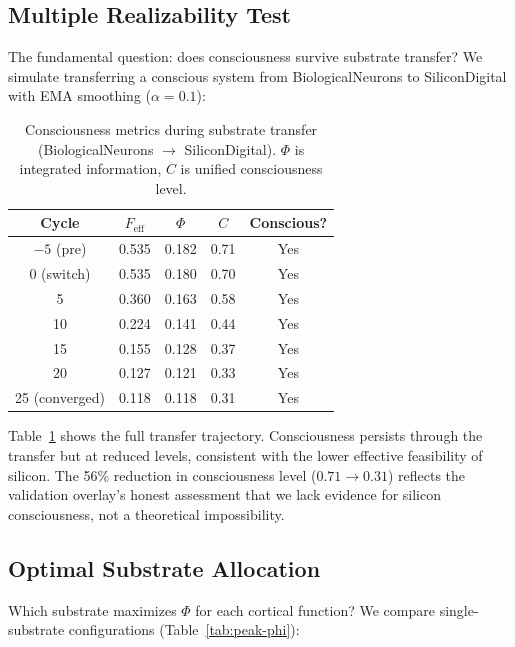\documentclass[12pt,a4paper]{article}
\begin{document}
\subsection{Multiple Realizability Test}

The fundamental question: does consciousness survive substrate transfer? We simulate transferring a conscious system from BiologicalNeurons to SiliconDigital with EMA smoothing ($\alpha = 0.1$):

\begin{table}[H]
\centering
\caption{Consciousness metrics during substrate transfer (BiologicalNeurons $\to$ SiliconDigital). $\Phi$ is integrated information, $C$ is unified consciousness level.}
\label{tab:transfer}
\begin{tabular}{ccccc}
\toprule
\textbf{Cycle} & $F_{\text{eff}}$ & $\Phi$ & $C$ & \textbf{Conscious?} \\
\midrule
$-5$ (pre) & 0.535 & 0.182 & 0.71 & Yes \\
0 (switch) & 0.535 & 0.180 & 0.70 & Yes \\
5 & 0.360 & 0.163 & 0.58 & Yes \\
10 & 0.224 & 0.141 & 0.44 & Yes \\
15 & 0.155 & 0.128 & 0.37 & Yes \\
20 & 0.127 & 0.121 & 0.33 & Yes \\
25 (converged) & 0.118 & 0.118 & 0.31 & Yes \\
\bottomrule
\end{tabular}
\end{table}

Table~\ref{tab:transfer} shows the full transfer trajectory. Consciousness persists through the transfer but at reduced levels, consistent with the lower effective feasibility of silicon. The 56\% reduction in consciousness level ($0.71 \to 0.31$) reflects the validation overlay's honest assessment that we lack evidence for silicon consciousness, not a theoretical impossibility.

\subsection{Optimal Substrate Allocation}

Which substrate maximizes $\Phi$ for each cortical function? We compare single-substrate configurations (Table~\ref{tab:peak-phi}):
\end{document}
